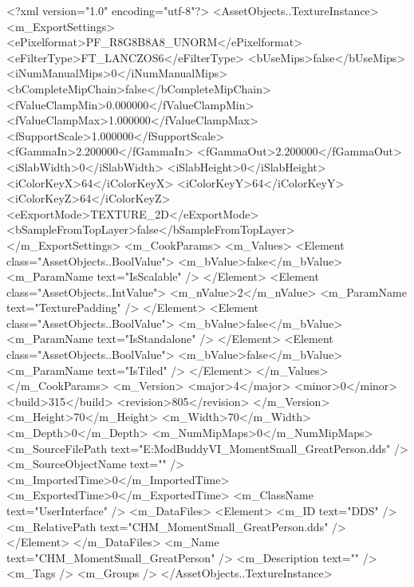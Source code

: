 ﻿<?xml version="1.0" encoding="utf-8"?>
<AssetObjects..TextureInstance>
  <m_ExportSettings>
    <ePixelformat>PF_R8G8B8A8_UNORM</ePixelformat>
    <eFilterType>FT_LANCZOS6</eFilterType>
    <bUseMips>false</bUseMips>
    <iNumManualMips>0</iNumManualMips>
    <bCompleteMipChain>false</bCompleteMipChain>
    <fValueClampMin>0.000000</fValueClampMin>
    <fValueClampMax>1.000000</fValueClampMax>
    <fSupportScale>1.000000</fSupportScale>
    <fGammaIn>2.200000</fGammaIn>
    <fGammaOut>2.200000</fGammaOut>
    <iSlabWidth>0</iSlabWidth>
    <iSlabHeight>0</iSlabHeight>
    <iColorKeyX>64</iColorKeyX>
    <iColorKeyY>64</iColorKeyY>
    <iColorKeyZ>64</iColorKeyZ>
    <eExportMode>TEXTURE_2D</eExportMode>
    <bSampleFromTopLayer>false</bSampleFromTopLayer>
  </m_ExportSettings>
  <m_CookParams>
    <m_Values>
      <Element class="AssetObjects..BoolValue">
        <m_bValue>false</m_bValue>
        <m_ParamName text="IsScalable" />
      </Element>
      <Element class="AssetObjects..IntValue">
        <m_nValue>2</m_nValue>
        <m_ParamName text="TexturePadding" />
      </Element>
      <Element class="AssetObjects..BoolValue">
        <m_bValue>false</m_bValue>
        <m_ParamName text="IsStandalone" />
      </Element>
      <Element class="AssetObjects..BoolValue">
        <m_bValue>false</m_bValue>
        <m_ParamName text="IsTiled" />
      </Element>
    </m_Values>
  </m_CookParams>
  <m_Version>
    <major>4</major>
    <minor>0</minor>
    <build>315</build>
    <revision>805</revision>
  </m_Version>
  <m_Height>70</m_Height>
  <m_Width>70</m_Width>
  <m_Depth>0</m_Depth>
  <m_NumMipMaps>0</m_NumMipMaps>
  <m_SourceFilePath text="E:\Documents\Firaxis ModBuddy\Civilization VI\ColoredHistoricMoments\ColoredHistoricMoments\Textures\CHM_MomentSmall_GreatPerson.dds" />
  <m_SourceObjectName text="" />
  <m_ImportedTime>0</m_ImportedTime>
  <m_ExportedTime>0</m_ExportedTime>
  <m_ClassName text="UserInterface" />
  <m_DataFiles>
    <Element>
      <m_ID text="DDS" />
      <m_RelativePath text="CHM_MomentSmall_GreatPerson.dds" />
    </Element>
  </m_DataFiles>
  <m_Name text="CHM_MomentSmall_GreatPerson" />
  <m_Description text="" />
  <m_Tags />
  <m_Groups />
</AssetObjects..TextureInstance>